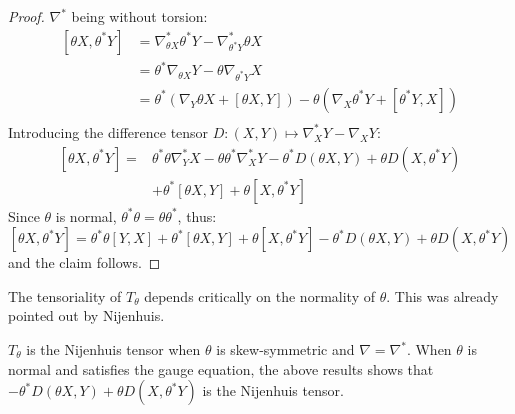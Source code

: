 \begin{proof}
    $\nabla^*$ being without torsion:
    \begin{equation}
        \begin{split}
            \left[ \theta X, \theta^* Y \right] & = \nabla^*_{\theta X} \theta^* Y - \nabla^*_{\theta^*Y} \theta X \\
            & = \theta^* \nabla_{\theta X} Y - \theta \nabla_{\theta^*Y} X \\
            & = \theta^* \left( \nabla_Y \theta X + \left[ \theta X, Y \right] \right) 
            - \theta \left( \nabla_X \theta^* Y  + \left[ \theta^*Y, X \right]\right) \\
        \end{split}
    \end{equation}
    Introducing the difference tensor $D \colon (X,Y) \mapsto \nabla_X^* Y - \nabla_X Y$:
    \begin{equation}
       \begin{split}
         \left[ \theta X, \theta^* Y \right]  =&
           \theta^* \theta \nabla^*_Y X - \theta \theta^* \nabla^*_X Y  - \theta^* D\left( \theta X, Y \right) + \theta D\left( X, \theta^*Y \right)\\
           & + \theta^* \left[ \theta X, Y \right] + \theta \left[ X, \theta^* Y \right]
       \end{split} 
    \end{equation}
    Since $\theta$ is normal, $\theta^* \theta = \theta \theta^*$, thus:
    \begin{equation}
        \left[ \theta X, \theta^* Y \right] = \theta^* \theta \left[ Y,X \right] + \theta^* \left[ \theta X, Y \right] + \theta \left[ X, \theta^* Y \right]
        -\theta^* D\left( \theta X, Y \right) + \theta D\left( X, \theta^*Y \right)
    \end{equation}
    and the claim follows.
\end{proof}
\begin{rem}
    The tensoriality of $T_\theta$ depends critically on the normality of $\theta$. This was already pointed out by 
    Nijenhuis.
\end{rem}
\begin{rem}
    $T_\theta$ is the Nijenhuis tensor when $\theta$ is skew-symmetric and $\nabla = \nabla^*$. When $\theta$ is normal and satisfies the gauge equation,
    the above results shows that $-\theta^*D\left(  \theta X, Y\right)+\theta D\left( X,\theta^*Y \right)$ is the Nijenhuis tensor. 
\end{rem}